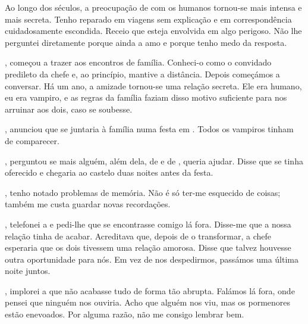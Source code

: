 {Ao longo dos séculos, a preocupação de  com os humanos tornou-se mais intensa e mais secreta. Tenho reparado em viagens sem explicação e em correspondência cuidadosamente escondida. Receio que esteja envolvida em algo perigoso. Não lhe perguntei diretamente porque ainda a amo e porque tenho medo da resposta.

,  começou a trazer  aos encontros de família. Conheci-o como o convidado predileto da chefe e, ao princípio, mantive a distância. Depois começámos a conversar. Há um ano, a amizade tornou-se uma relação secreta. Ele era humano, eu era vampiro, e as regras da família faziam disso motivo suficiente para nos arruinar aos dois, caso se soubesse.

,  anunciou que  se juntaria à família numa festa em . Todos os vampiros tinham de comparecer.

,  perguntou se mais alguém, além dela, de  e de , queria ajudar. Disse que  se tinha oferecido e chegaria ao castelo duas noites antes da festa.

, tenho notado problemas de memória. Não é só ter-me esquecido de coisas; também me custa guardar novas recordações.

, telefonei a  e pedi-lhe que se encontrasse comigo lá fora. Disse-me que a nossa relação tinha de acabar. Acreditava que, depois de  o transformar, a chefe esperaria que os dois tivessem uma relação amorosa. Disse que talvez houvesse outra oportunidade para nós. Em vez de nos despedirmos, passámos uma última noite juntos.

, implorei a  que não acabasse tudo de forma tão abrupta. Falámos lá fora, onde pensei que ninguém nos ouviria. Acho que alguém nos viu, mas os pormenores estão enevoados. Por alguma razão, não me consigo lembrar bem.

}
